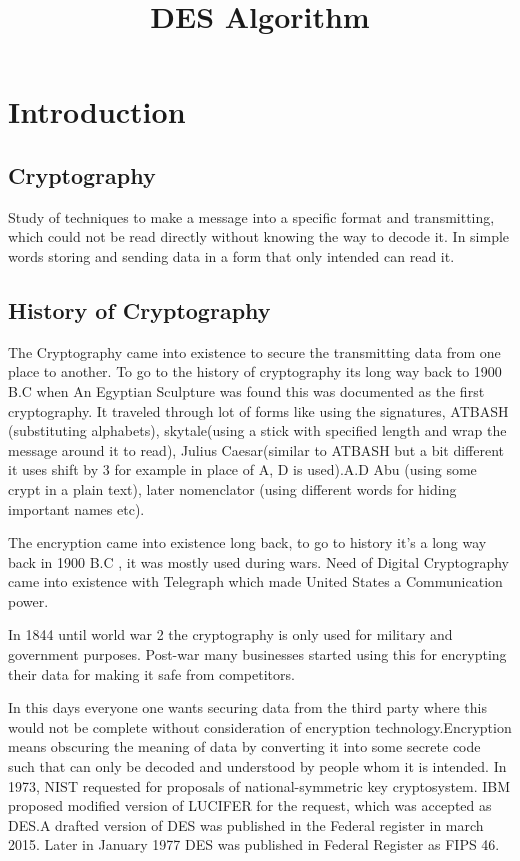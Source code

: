 \documentclass[11pt]{article}
\title{DES Algorithm}
\author{}
\date{}
\begin{document}
\maketitle

 
\section{Introduction}
\subsection{Cryptography}
 Study of techniques to make a message into a specific format and transmitting, which could not be read directly without knowing the way to decode it.
In simple words storing and sending data in a form that only intended can read it.


\subsection{History of Cryptography}
The Cryptography came into existence to secure the transmitting data from one place to another. To go to the history of cryptography its long way back to 1900 B.C\cite{History} when An Egyptian Sculpture was found this was documented as the first cryptography.
It traveled through lot of forms like using the signatures, ATBASH (substituting alphabets), skytale(using a stick with specified length and wrap the message around it to read), Julius Caesar(similar to ATBASH but a bit different it uses shift by 3 for example in place of A, D is used).A.D Abu (using some crypt in a plain text), later nomenclator (using different words for hiding important names etc).  


The encryption came into existence long back, to go to history it’s a long way back in 1900 B.C , it was  mostly used during wars.  Need of Digital Cryptography came into existence with Telegraph which made United States a Communication power.

In 1844 until world war 2 the cryptography is only used for military and government purposes. Post-war many businesses started using this for encrypting their data for making it safe from competitors.

In this days everyone one wants securing data from the third party where this would not be complete without consideration of encryption technology.Encryption means obscuring the meaning of data by converting it into some secrete code such that can only be decoded and understood by people whom it is intended.
In 1973, NIST requested for proposals of national-symmetric key cryptosystem. IBM proposed modified version of LUCIFER for the request, which was accepted as DES.A drafted version of DES was published in the Federal register in march 2015. Later in January 1977 DES was published in Federal Register as FIPS 46.
\end{document}
